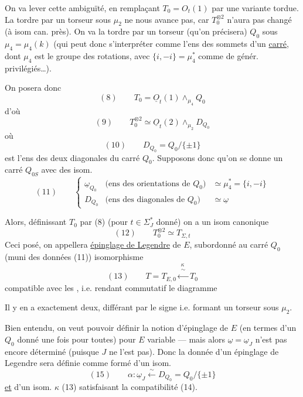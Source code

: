 On va lever cette ambiguïté, en remplaçant $T_0=O_t(1)$ par une variante tordue. La tordre par un torseur sous $\mu_2$  ne nous avance pas, car  $T_0^{\otimes2}$ n'aura pas changé (à isom can. près). On va la tordre par un torseur (qu'on précisera) $Q_0$ sous $\mu_4=\mu_4(k)$ (qui peut donc s'interpréter comme l'ens des sommets d'un \uline{carré}, dont $\mu_4$ est le groupe des rotations, avec $\{i,-i\}=\mu_4^*$ comme  de génér. privilégiés\ldots).

On posera donc
\[
(8)\qquad T_0=\underline O_t(1)\wedge_{\mu_4}Q_0
\]
d'où
\[
(9)\qquad T_0^{\otimes2}\simeq\underline O_t(2)\wedge_{\mu_2}D_{Q_0}
\]
où
\[
(10)\qquad D_{Q_0}=Q_0/\{\pm1\}
\]
est l'ens des deux diagonales du carré $Q_0$. Supposons donc qu'on se donne un carré  $Q_{0S}$ avec des isom. 
\[
(11)\qquad\left\{
\begin{array}{lll}
\underline\omega_{Q_0}&\text{(ens des orientations de $Q_0$)}&\simeq\mu_4^*=\{i,-i\}\\
D_{Q_0}&\text{(ens des diagonales de $Q_0$)}&\simeq\underline\omega
\end{array}\right.
\]

Alors, définissant $T_0$ par (8) (pour $t\in\Sigma_J^*$ donné) on a un isom canonique
\[
(12)\qquad T_0^{\otimes2}\simeq T_{\Sigma,t}
\]
Ceci posé, on appellera \uline{épinglage de Legendre}
de $E$, subordonné au carré $Q_0$ (muni des données (11))   isomorphisme
\[
(13)\qquad T=T_{E,0}\xleftarrow{\substack{\kappa\\\sim}}T_0
\]
compatible avec les , i.e. rendant commutatif le diagramme

Il y en a exactement deux, différant par le signe i.e. formant un torseur sous $\mu_2$.

Bien entendu, on veut pouvoir définir la notion d'épinglage de $E$ (en termes d'un $Q_0$ donné une fois pour toutes) pour $E$ variable --- mais alors $\underline\omega=\underline\omega_J$ n'est pas encore déterminé (puisque $J$ ne l'est pas). Donc la donnée d'un épinglage de Legendre sera définie comme  \inserted{$(\alpha,\kappa)$} formé d'un isom.
\[
(15)\qquad\alpha:\underline\omega_J\xleftarrow{\sim}D_{Q_0}=Q_0/\{\pm1\}
\]
\uline{et} d'un isom. $\kappa$ (13) satisfaisant la compatibilité (14).
